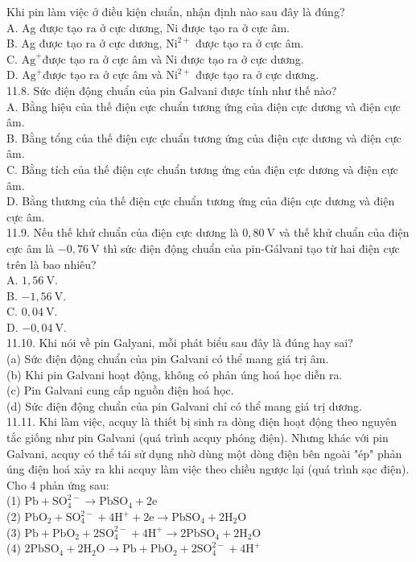 \documentclass[10pt]{article}
\begin{document}
Khi pin làm việc ở điều kiện chuẩn, nhận định nào sau đây là đúng?\\
A. Ag được tạo ra ở cực dương, Ni được tạo ra ở cực âm.\\
B. Ag được tạo ra ở cực dương, $\mathrm{Ni}^{2+}$ được tạo ra ở cực âm.\\
C. $\mathrm{Ag}^{+}$được tạo ra ở cực âm và Ni được tạo ra ở cực dương.\\
D. $\mathrm{Ag}^{+}$được tạo ra ở cực âm và $\mathrm{Ni}^{2+}$ được tạo ra ở cực dương.\\
11.8. Sức điện động chuẩn của pin Galvani được tính như thế nào?\\
A. Bằng hiệu của thế điện cực chuẩn tương ứng của điện cực dương và điện cực âm.\\
B. Bằng tổng của thế điện cực chuẩn tương ứng của điện cực dương và điện cực âm.\\
C. Bằng tích của thế điện cực chuẩn tương ứng của điện cực dương và điện cực âm.\\
D. Bằng thương của thế điện cực chuẩn tương ứng của điện cực dương và điện cực âm.\\
11.9. Nếu thế khử chuẩn của điện cực dương là $0,80 \mathrm{~V}$ và thế khử chuẩn của điện cực âm là $-0,76 \mathrm{~V}$ thì sức điện động chuẩn của pin-Gálvani tạo từ hai điện cực trên là bao nhiêu?\\
A. $1,56 \mathrm{~V}$.\\
B. $-1,56 \mathrm{~V}$.\\
C. $0,04 \mathrm{~V}$.\\
D. $-0,04 \mathrm{~V}$.\\
11.10. Khi nói về pin Galyani, mỗi phát biểu sau đây là đúng hay sai?\\
(a) Sức điện động chuẩn của pin Galvani có thể mang giá trị âm.\\
(b) Khi pin Galvani hoạt động, không có phản úng hoá học diễn ra.\\
(c) Pin Galvani cung cấp nguồn điện hoá học.\\
(d) Sức điện động chuẩn của pin Galvani chỉ có thể mang giá trị dương.\\
11.11. Khi làm việc, acquy là thiết bị sinh ra dòng điện hoạt động theo nguyên tắc giống như pin Galvani (quá trình acquy phóng điện). Nhưng khác với pin Galvani, acquy có thể tái sử dụng nhờ dùng một dòng điện bên ngoài "ép" phản úng điện hoá xảy ra khi acquy làm việc theo chiều ngược lại (quá trình sạc điện).\\
Cho 4 phản ứng sau:\\
(1) $\mathrm{Pb}+\mathrm{SO}_{4}^{2-} \rightarrow \mathrm{PbSO}_{4}+2 \mathrm{e}$\\
(2) $\mathrm{PbO}_{2}+\mathrm{SO}_{4}^{2-}+4 \mathrm{H}^{+}+2 \mathrm{e} \rightarrow \mathrm{PbSO}_{4}+2 \mathrm{H}_{2} \mathrm{O}$\\
(3) $\mathrm{Pb}+\mathrm{PbO}_{2}+2 \mathrm{SO}_{4}^{2-}+4 \mathrm{H}^{+} \rightarrow 2 \mathrm{PbSO}_{4}+2 \mathrm{H}_{2} \mathrm{O}$\\
(4) $2 \mathrm{PbSO}_{4}+2 \mathrm{H}_{2} \mathrm{O} \rightarrow \mathrm{Pb}+\mathrm{PbO}_{2}+2 \mathrm{SO}_{4}^{2-}+4 \mathrm{H}^{+}$
\end{document}

